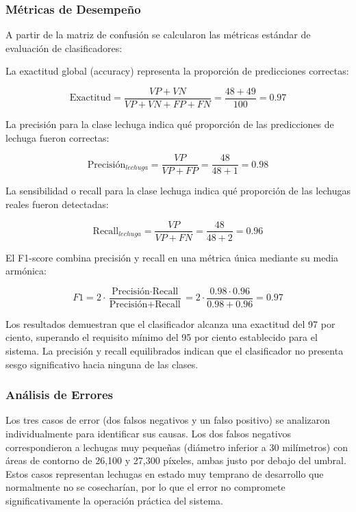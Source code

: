 \subsubsection{Métricas de Desempeño}

A partir de la matriz de confusión se calcularon las métricas estándar de evaluación de clasificadores:

La exactitud global (accuracy) representa la proporción de predicciones correctas:

\begin{equation}
\text{Exactitud} = \frac{VP + VN}{VP + VN + FP + FN} = \frac{48 + 49}{100} = 0.97
\end{equation}

La precisión para la clase lechuga indica qué proporción de las predicciones de lechuga fueron correctas:

\begin{equation}
\text{Precisión}_{lechuga} = \frac{VP}{VP + FP} = \frac{48}{48 + 1} = 0.98
\end{equation}

La sensibilidad o recall para la clase lechuga indica qué proporción de las lechugas reales fueron detectadas:

\begin{equation}
\text{Recall}_{lechuga} = \frac{VP}{VP + FN} = \frac{48}{48 + 2} = 0.96
\end{equation}

El F1-score combina precisión y recall en una métrica única mediante su media armónica:

\begin{equation}
F1 = 2 \cdot \frac{\text{Precisión} \cdot \text{Recall}}{\text{Precisión} + \text{Recall}} = 2 \cdot \frac{0.98 \cdot 0.96}{0.98 + 0.96} = 0.97
\end{equation}

Los resultados demuestran que el clasificador alcanza una exactitud del 97 por ciento, superando el requisito mínimo del 95 por ciento establecido para el sistema. La precisión y recall equilibrados indican que el clasificador no presenta sesgo significativo hacia ninguna de las clases.

\subsubsection{Análisis de Errores}

Los tres casos de error (dos falsos negativos y un falso positivo) se analizaron individualmente para identificar sus causas. Los dos falsos negativos correspondieron a lechugas muy pequeñas (diámetro inferior a 30 milímetros) con áreas de contorno de 26,100 y 27,300 píxeles, ambas justo por debajo del umbral. Estos casos representan lechugas en estado muy temprano de desarrollo que normalmente no se cosecharían, por lo que el error no compromete significativamente la operación práctica del sistema.

